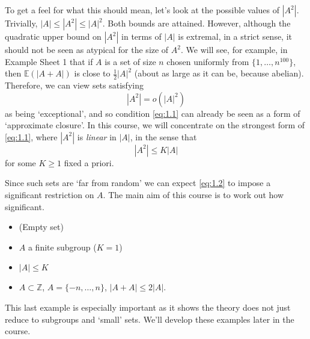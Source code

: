 \documentclass{article}
\newcommand{\named}[1]{\textbf{#1}\index{#1}}
\numberwithin{equation}{section}
\begin{document}
To get a feel for what this should mean, let's look at the possible values of $|A^2|$.
Trivially, $|A| \leq |A^2| \leq |A|^2$. Both bounds are attained. However, although the quadratic upper bound on $|A^2|$ in terms of $|A|$ is extremal, in a strict sense, it should not be seen as atypical for the size of $A^2$.
We will see, for example, in Example Sheet 1 that if $A$ is a set of size $n$ chosen uniformly from $\{1, \dotsc, n^{100}\}$, then $\mathbb{E}(|A+A|)$ is close to $\frac{1}{2} |A|^2$ (about as large as it can be, because abelian).
Therefore, we can view sets satisfying
\begin{equation}
  |A^2| = o\!\left(|A|^2\right) \label{eq:1.1}
\end{equation}
as being `exceptional', and so condition \eqref{eq:1.1} can already be seen as a form of `approximate closure'.
In this course, we will concentrate on the strongest form of \eqref{eq:1.1}, where $|A^2|$ is \emph{linear} in $|A|$, in the sense that
\begin{equation}
  |A^2| \leq K |A| \label{eq:1.2}
\end{equation}
for some $K \geq 1$ fixed a priori.

Since such sets are `far from random' we can expect \eqref{eq:1.2} to impose a significant restriction on $A$.
The main aim of this course is to work out how significant.


\begin{eg}\leavevmode
  \begin{itemize}
    \item (Empty set)
    \item $A$ a finite subgroup ($K=1$)
    \item $|A| \leq K$
    \item $A \subset \mathbb{Z}$, $A = \{-n, \dotsc, n\}$, $|A+A| \leq 2 |A|$.
  \end{itemize}
\end{eg}
This last example is especially important as it shows the theory does not just reduce to subgroups and `small' sets.
We'll develop these examples later in the course.
\end{document}
